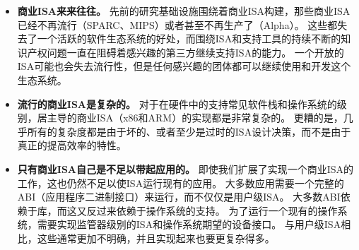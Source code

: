 \begin{itemize}
\item {\bf 商业ISA来来往往。} 先前的研究基础设施围绕着商业ISA构建，那些商业ISA已经不再流行（SPARC、MIPS）或者甚至不再生产了（Alpha）。
  这些都失去了一个活跃的软件生态系统的好处，而围绕ISA和支持工具的持续不断的知识产权问题一直在阻碍着感兴趣的第三方继续支持ISA的能力。
  一个开放的ISA可能也会失去流行性，但是任何感兴趣的团体都可以继续使用和开发这个生态系统。

\item  {\bf 流行的商业ISA是复杂的。} 对于在硬件中的支持常见软件栈和操作系统的级别，居主导的商业ISA（x86和ARM）的实现都是非常复杂的。
更糟的是，几乎所有的复杂度都是由于坏的、或者至少是过时的ISA设计决策，而不是由于真正的提高效率的特性。

\item {\bf 只有商业ISA自己是不足以带起应用的。} 即使我们扩展了实现一个商业ISA的工作，这也仍然不足以使ISA运行现有的应用。
大多数应用需要一个完整的ABI（应用程序二进制接口）来运行，而不仅仅是用户级ISA。
大多数ABI依赖于库，而这又反过来依赖于操作系统的支持。
为了运行一个现有的操作系统，需要实现监管器级别的ISA和操作系统期望的设备接口。
与用户级ISA相比，这些通常更加不明确，并且实现起来也要更复杂得多。


\end{itemize}
